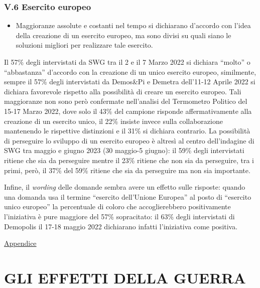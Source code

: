 \documentclass[
  openany]{book}
\providecommand{\tightlist}{%
  \setlength{\itemsep}{0pt}\setlength{\parskip}{0pt}}
\begin{document}
\hypertarget{v.6-esercito-europeo}{%
\subsection{V.6 Esercito europeo}\label{v.6-esercito-europeo}}

\begin{itemize}
\tightlist
\item
  Maggioranze assolute e costanti nel tempo si dichiarano d'accordo con l'idea della creazione di un esercito europeo, ma sono divisi su quali siano le soluzioni migliori per realizzare tale esercito.
\end{itemize}

Il 57\% degli intervistati da SWG tra il 2 e il 7 Marzo 2022 si dichiara ``molto'' o ``abbastanza'' d'accordo con la creazione di un unico esercito europeo, similmente, sempre il 57\% degli intervistati da Demos\&Pi e Demetra dell'11-12 Aprile 2022 si dichiara favorevole rispetto alla possibilità di creare un esercito europeo. Tali maggioranze non sono però confermate nell'analisi del Termometro Politico del 15-17 Marzo 2022, dove solo il 43\% del campione risponde affermativamente alla creazione di un esercito unico, il 22\% insiste invece sulla collaborazione mantenendo le rispettive distinzioni e il 31\% si dichiara contrario. La possibilità di perseguire lo sviluppo di un esercito europeo è altresì al centro dell'indagine di SWG tra maggio e giugno 2023 (30 maggio-5 giugno): il 59\% degli intervistati ritiene che sia da perseguire mentre il 23\% ritiene che non sia da perseguire, tra i primi, però, il 37\% del 59\% ritiene che sia da perseguire ma non sia importante.

Infine, il \emph{wording} delle domande sembra avere un effetto sulle risposte: quando una domanda usa il termine ``esercito dell'Unione Europea'' al posto di ``esercito unico europeo'' la percentuale di coloro che accoglierebbero positivamente l'iniziativa è pure maggiore del 57\% sopracitato: il 63\% degli intervistati di Demopolis il 17-18 maggio 2022 dichiarano infatti l'iniziativa come positiva.

\href{https://github.com/LucianaFazio/Ucrania/blob/main/PDF_Appendice/V.\%20Cosa\%20dobbiamo\%20possiamo\%20fare\%20noi\%20v.5.pdf}{Appendice}

\hypertarget{gli-effetti-della-guerra}{%
\chapter{GLI EFFETTI DELLA GUERRA}\label{gli-effetti-della-guerra}}
\end{document}
